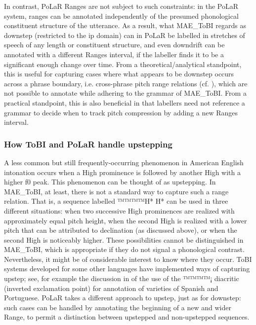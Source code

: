 \documentclass[11pt, twoside]{memoir}
\begin{document}
In contrast, PoLaR Ranges are not subject to such constraints: in the PoLaR system, ranges can be annotated independently of the presumed phonological constituent structure of the utterance. As a result, what MAE\_ToBI regards as downstep (restricted to the ip domain) can in PoLaR be labelled in stretches of speech of any length or constituent structure, and even downdrift can be annotated with a different Ranges interval, if the labeller finds it to be a significant enough change over time. From a theoretical\slash analytical standpoint, this is useful for capturing cases where what appears to be downstep occurs across a phrase boundary, i.e. cross-phrase pitch range relations (cf. \citealt{ladd88, brugos15}), which are not possible to annotate while adhering to the grammar of MAE\_ToBI. From a practical standpoint, this is also beneficial in that labellers need not reference a grammar to decide when to track pitch compression by adding a new Ranges interval.

\subsubsection{How ToBI and PoLaR handle upstepping}\label{sec:upstepping}
A less common but still frequently-occurring phenomenon in American English intonation occurs when a High prominence is followed by another High with a higher f0 peak.  This phenomenon can be thought of as upstepping. In MAE\_ToBI, at least, there is not a standard way to capture such a range relation.  That is, a sequence labelled ™™™™{H* H*} can be used in three different situations: when two successive High prominences are realized with approximately equal pitch height, when the second High is realized with a lower pitch that can be attributed to declination (as discussed above), or when the second High is noticeably higher. These possibilities cannot be distinguished in MAE\_ToBI, which is appropriate if they do not signal a phonological contrast. Nevertheless, it might be of considerable interest to know where they occur. ToBI systems developed for some other languages have implemented ways of capturing upstep; see, for example the discussion in \citet{armstrong-14} of the use of the ™™™™{¡} diacritic (inverted exclamation point) for annotation of varieties of Spanish and Portuguese. PoLaR takes a different approach to upstep, just as for downstep: such cases can be handled by annotating the beginning of a new and wider Range, to permit a distinction between upstepped and non-upstepped sequences.
\end{document}
